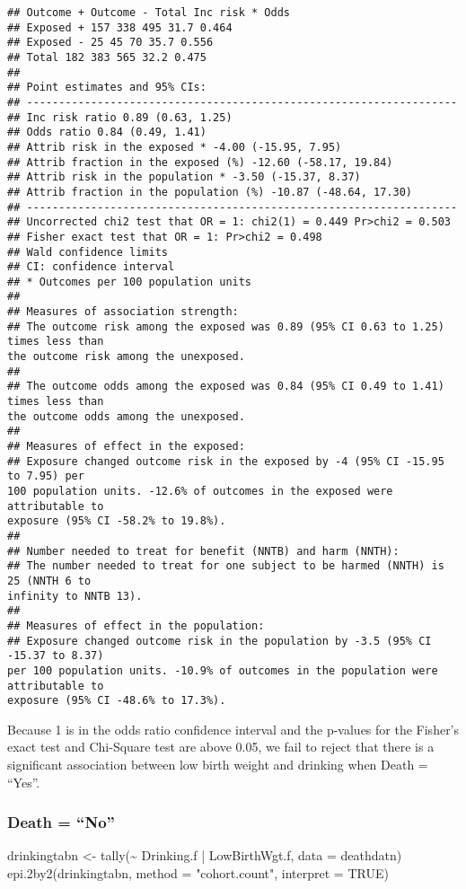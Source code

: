 \documentclass[
]{article}
\newenvironment{Shaded}{\begin{snugshade}}{\end{snugshade}}
\newcommand{\AttributeTok}[1]{\textcolor[rgb]{0.77,0.63,0.00}{#1}}
\newcommand{\ConstantTok}[1]{\textcolor[rgb]{0.00,0.00,0.00}{#1}}
\newcommand{\FunctionTok}[1]{\textcolor[rgb]{0.00,0.00,0.00}{#1}}
\newcommand{\NormalTok}[1]{#1}
\newcommand{\OtherTok}[1]{\textcolor[rgb]{0.56,0.35,0.01}{#1}}
\newcommand{\SpecialCharTok}[1]{\textcolor[rgb]{0.00,0.00,0.00}{#1}}
\newcommand{\StringTok}[1]{\textcolor[rgb]{0.31,0.60,0.02}{#1}}
\begin{document}
\begin{verbatim}
## Outcome + Outcome - Total Inc risk * Odds
## Exposed + 157 338 495 31.7 0.464
## Exposed - 25 45 70 35.7 0.556
## Total 182 383 565 32.2 0.475
##
## Point estimates and 95% CIs:
## -------------------------------------------------------------------
## Inc risk ratio 0.89 (0.63, 1.25)
## Odds ratio 0.84 (0.49, 1.41)
## Attrib risk in the exposed * -4.00 (-15.95, 7.95)
## Attrib fraction in the exposed (%) -12.60 (-58.17, 19.84)
## Attrib risk in the population * -3.50 (-15.37, 8.37)
## Attrib fraction in the population (%) -10.87 (-48.64, 17.30)
## -------------------------------------------------------------------
## Uncorrected chi2 test that OR = 1: chi2(1) = 0.449 Pr>chi2 = 0.503
## Fisher exact test that OR = 1: Pr>chi2 = 0.498
## Wald confidence limits
## CI: confidence interval
## * Outcomes per 100 population units
##
## Measures of association strength:
## The outcome risk among the exposed was 0.89 (95% CI 0.63 to 1.25) times less than
the outcome risk among the unexposed.
##
## The outcome odds among the exposed was 0.84 (95% CI 0.49 to 1.41) times less than
the outcome odds among the unexposed.
##
## Measures of effect in the exposed:
## Exposure changed outcome risk in the exposed by -4 (95% CI -15.95 to 7.95) per
100 population units. -12.6% of outcomes in the exposed were attributable to
exposure (95% CI -58.2% to 19.8%).
##
## Number needed to treat for benefit (NNTB) and harm (NNTH):
## The number needed to treat for one subject to be harmed (NNTH) is 25 (NNTH 6 to
infinity to NNTB 13).
##
## Measures of effect in the population:
## Exposure changed outcome risk in the population by -3.5 (95% CI -15.37 to 8.37)
per 100 population units. -10.9% of outcomes in the population were attributable to
exposure (95% CI -48.6% to 17.3%).
\end{verbatim}

Because 1 is in the odds ratio confidence interval and the p-values for
the Fisher's exact test and Chi-Square test are above 0.05, we fail to
reject that there is a significant association between low birth weight
and drinking when Death = ``Yes''.

\hypertarget{death-no-1}{%
\subsubsection{Death = ``No''}\label{death-no-1}}

\begin{Shaded}
\begin{Highlighting}[]
\NormalTok{drinkingtabn }\OtherTok{\textless{}{-}} \FunctionTok{tally}\NormalTok{(}\SpecialCharTok{\textasciitilde{}}\NormalTok{ Drinking.f }\SpecialCharTok{|}\NormalTok{ LowBirthWgt.f, }\AttributeTok{data =}\NormalTok{ deathdatn)}
\FunctionTok{epi.2by2}\NormalTok{(drinkingtabn, }\AttributeTok{method =} \StringTok{"cohort.count"}\NormalTok{, }\AttributeTok{interpret =} \ConstantTok{TRUE}\NormalTok{)}
\end{Highlighting}
\end{Shaded}
\end{document}
